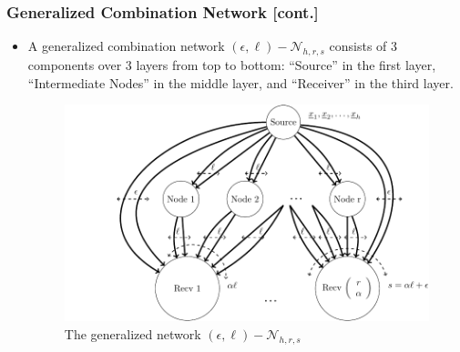 \documentclass[c]{beamer}
\begin{document}
\begin{frame}[c]
\frametitle{Generalized Combination Network [cont.]}

	\begin{itemize}
		\item A generalized combination network $(\epsilon,\ell)-\mathcal{N}_{h,r,s}$ consists of 3 components over 3 layers from top to bottom: “Source” in the first layer, “Intermediate Nodes” in the middle layer, and “Receiver” in the third layer.
			\begin{figure}[H]
			\caption{The generalized network $(\epsilon,\ell)-\mathcal{N}_{h,r,s}$\label{fig:The-generalized-network}}
			
			\centering{}\includegraphics[width=0.5\paperwidth]{../figures/generalized_combination_nw}
			\end{figure}
	\end{itemize}

\end{frame}
\end{document}
